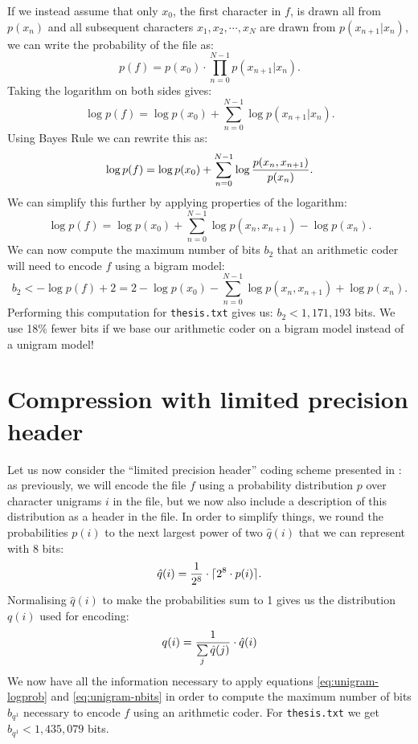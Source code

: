 \documentclass[10pt,a4paper,oneside,onecolumn]{article}
\DeclarePairedDelimiter{\ceil}{\lceil}{\rceil}
\newcommand*{\thesisTXT}{{\tt thesis.txt}\xspace}
\begin{document}
If we instead assume that only $x_0$, the first character in $f$, is drawn all
from $p(x_n)$ and all subsequent characters $x_1, x_2, \cdots, x_N$ are drawn
from $p(x_{n+1} | x_n)$, we can write the probability of the file as:
\begin{equation}
    p(f) = p(x_0) \cdot \prod\limits_{n = 0}^{N - 1} p(x_{n + 1} | x_n).
\end{equation}
Taking the logarithm on both sides gives:
\begin{equation}
    \log p(f) =
    \log p(x_0) + \sum\limits_{n = 0}^{N - 1} \log p(x_{n + 1} | x_n).
\end{equation}
Using Bayes Rule we can rewrite this as:
\begin{equation}
    \log p(f)
    = \log p(x_0)
    + \sum\limits_{n = 0}^{N - 1} \log {p(x_n, x_{n + 1}) \over p(x_n)}.
\end{equation}
We can simplify this further by applying properties of the logarithm:
\begin{equation}\label{eq:bigram-logprob}
    \log p(f)
    = \log p(x_0)
    + \sum\limits_{n = 0}^{N - 1} \log p(x_n, x_{n + 1}) - \log p(x_n).
\end{equation}
We can now compute the maximum number of bits $b_2$ that an arithmetic coder
will need to encode $f$ using a bigram model:
\begin{equation}\label{eq:bigram-nbits}
    b_2 < -\log p(f) + 2
    = 2 - \log p(x_0)
    - \sum\limits_{n = 0}^{N - 1} \log p(x_n, x_{n + 1}) + \log p(x_n).
\end{equation}
Performing this computation for \thesisTXT gives us: $b_2 < 1,171,193$ bits. We
use 18\% fewer bits if we base our arithmetic coder on a bigram model instead of
a unigram model!


\section{Compression with limited precision header}\label{sec:ex4}

Let us now consider the ``limited precision header'' coding scheme presented in
\cite{it-assign}: as previously, we will encode the file $f$ using a probability
distribution $p$ over character unigrams $i$ in the file, but we now also
include a description of this distribution as a header in the file. In order to
simplify things, we round the probabilities $p(i)$ to the next largest power of
two ${\hat q}(i)$ that we can represent with 8 bits:
\begin{equation}
    {\hat q}(i) = {1 \over 2^8} \cdot \ceil{2^8 \cdot p(i)}.
\end{equation}
Normalising ${\hat q}(i)$ to make the probabilities sum to 1 gives us the
distribution $q(i)$ used for encoding:
\begin{equation}
    q(i) = {1 \over \sum\limits_{j} {\hat q}(j)} \cdot {\hat q}(i)
\end{equation}
We now have all the information necessary to apply equations
\eqref{eq:unigram-logprob} and \eqref{eq:unigram-nbits} in order to compute the
maximum number of bits $b_{q^1}$ necessary to encode $f$ using an arithmetic
coder.  For \thesisTXT we get $b_{q^1} < 1,435,079$ bits.
\end{document}
